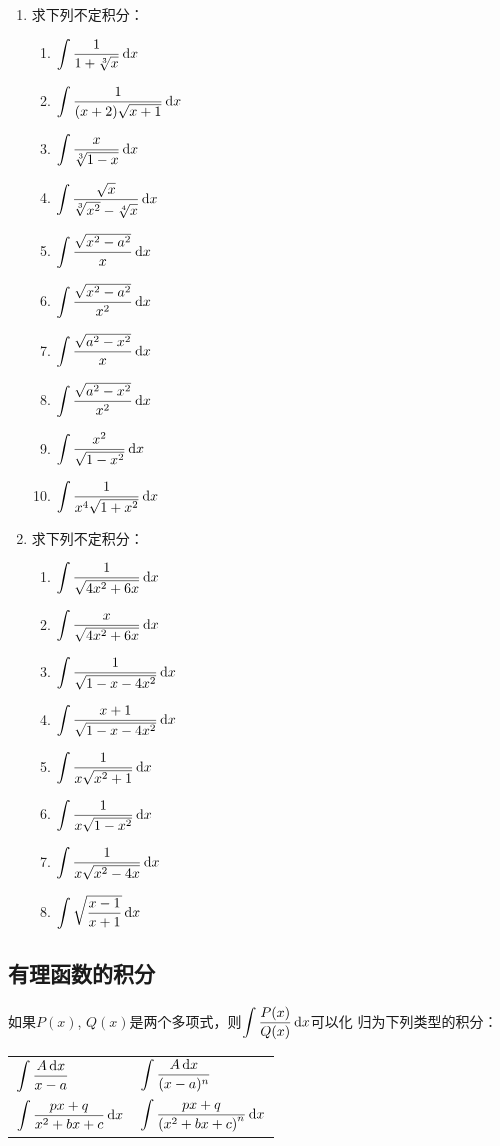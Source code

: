 \begin{ex}
\begin{enumerate}
    \item 求下列不定积分：
\begin{multicols}{2}
\begin{enumerate}
    \item $\displaystyle\int \dfrac{1}{1+\sqrt[3]{x}}\,{\rm d} x$
    \item $\displaystyle\int \dfrac{1}{(x+2) \sqrt{x+1}}\,{\rm d} x$
    \item $\displaystyle\int  \dfrac{x}{\sqrt[3]{1-x}}\,{\rm d} x $
    \item $\displaystyle\int \dfrac{\sqrt{x}}{\sqrt[3]{x^{2}}-\sqrt[4] {x}}\,{\rm d} x$
    \item $\displaystyle\int  \dfrac{\sqrt{x^{2}-a^{2}}}{x}\,{\rm d} x $
    \item $\displaystyle\int  \dfrac{\sqrt{x^{2}-a^{2}}}{x^{2}}\,{\rm d} x$
    \item $\displaystyle\int  \dfrac{\sqrt{a^{2}-x^{2}}}{x}\,{\rm d} x$
    \item $\displaystyle\int \dfrac{\sqrt{a^{2}-x^{2}}}{x^{2}}\,{\rm d} x$
    \item $\displaystyle\int \dfrac{x^{2}}{\sqrt{1-x^{2}}}\,{\rm d} x$
    \item $\displaystyle\int \dfrac{1}{x^{4} \sqrt{1+x^{2}}}\,{\rm d} x$
\end{enumerate}
\end{multicols}

    \item 求下列不定积分：
\begin{multicols}{2}
\begin{enumerate}
\item $\displaystyle\int \dfrac{1}{\sqrt{4 x^{2}+6 x}}\,{\rm d} x $
\item $\displaystyle\int \dfrac{x}{\sqrt{4 x^{2}+6 x}}\,{\rm d} x$
\item $\displaystyle\int  \dfrac{1}{\sqrt{1-x-4 x^{2}}}\,{\rm d} x$
\item $\displaystyle\int \dfrac{x+1}{\sqrt{1-x-4 x^{2}}}\,{\rm d} x$
\item $\displaystyle\int \dfrac{1}{x \sqrt{x^{2}+1}}\,{\rm d} x$
\item $\displaystyle\int \dfrac{1}{x \sqrt{1-x^{2}}}\,{\rm d} x$
\item $\displaystyle\int \dfrac{1}{x \sqrt{x^{2}-4 x}}\,{\rm d} x$
\item $\displaystyle\int \sqrt{\dfrac{x-1}{x+1}}\,{\rm d} x$  
\end{enumerate}
\end{multicols}

\end{enumerate}    
\end{ex}

\subsection{有理函数的积分}
如果$P(x)$, $Q(x)$是两个多项式，则$\displaystyle\int \dfrac{P(x)}{Q(x)}\,{\rm d} x$可以化
归为下列类型的积分：
\begin{center}
\begin{tabular}{p{}p{}}
        $\displaystyle\int \dfrac{A \,{\rm d} x}{x-a}$ & $\displaystyle\int \dfrac{A \,{\rm d} x}{(x-a)^{n}}$ \\
        $\displaystyle\int \dfrac{p x+q}{x^{2}+b x+c} \,{\rm d} x$ & $\displaystyle\int \dfrac{p x+q}{\left(x^{2}+b x+c\right)^{n}} \,{\rm d} x$
\end{tabular}
\end{center}

